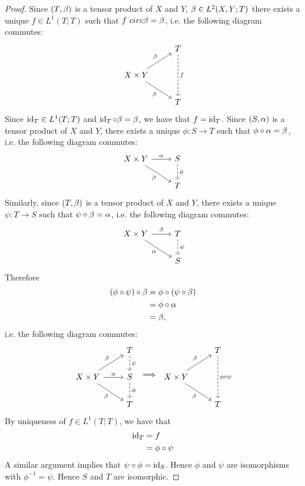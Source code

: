 \documentclass{book}
\begin{document}
 \begin{proof}
 	Since $(T, \beta)$ is a tensor product of $X$ and $Y$, $\beta \in L^2(X,Y; T)$ there exists a unique $f \in L^1(T;T)$ such that $f\ circ \beta = \beta$, i.e. the following diagram commutes: 
 	\[ 
 	\begin{tikzcd}
 		& T \arrow[dd, dashed, "f"] \\
 		X \times Y \arrow[ur, "\be"] \arrow[dr, "\be"'] 
 		&   \\
 		& T 
 	\end{tikzcd}
 	\] 
 	Since $\operatorname{id}_T \in L^1(T;T)$ and $\operatorname{id}_T \circ \beta = \beta$, we have that $f = \operatorname{id}_T$. Since $(S, \alpha)$ is a tensor product of $X$ and $Y$, there exists a unique $\phi: S \rightarrow T$ such that $\phi \circ \alpha = \beta$, i.e. the following diagram commutes: 
 	\[ 
 	\begin{tikzcd}
 		X \times Y \arrow[r, "\al"] \arrow[dr, "\be"'] 	
 		& S  \arrow[d, dashed, "\phi"] \\
 		& T 
 	\end{tikzcd}
 	\] 
 	Similarly, since $(T, \beta)$ is a tensor product of $X$ and $Y$, there exists a unique $\psi: T \rightarrow S$ such that $\psi \circ \beta = \alpha$, i.e. the following diagram commutes: 
 	\[ 
 	\begin{tikzcd}
 		X \times Y \arrow[r, "\be"] \arrow[dr, "\al"'] 	
 		& T  \arrow[d, dashed, "\psi"] \\
 		& S 
 	\end{tikzcd}
 	\] 
 	Therefore 
 	\begin{align*}
 		(\phi \circ \psi) \circ \beta 
 		& = \phi \circ (\psi \circ \beta) \\
 		& = \phi \circ \alpha \\
 		& = \beta, 
 	\end{align*}
 	i.e. the following diagram commutes:
 	\[ 
 	\begin{tikzcd}
 		& T \arrow[d, dashed, "\psi"] \\
 		X \times Y \arrow[ur, "\be"] \arrow[dr, "\be"'] \arrow[r, "\al"]	
 		& S  \arrow[d, dashed, "\phi"] \\
 		& T 
 	\end{tikzcd}
 	\implies
 	\begin{tikzcd}
 		& T \arrow[dd, dashed, "\phi \circ \psi"] \\
 		X \times Y \arrow[ur, "\be"] \arrow[dr, "\be"'] 
 		&  \\
 		& T 
 	\end{tikzcd}
 	\] 
 	By uniqueness of $f \in L^1(T;T)$, we have that 
 	\begin{align*}
 		\operatorname{id}_T
 		& = f \\
 		& = \phi \circ \psi 
 	\end{align*}
 	A similar argument implies that $\psi \circ \phi = \operatorname{id}_S$. Hence $\phi$ and $\psi$ are isomorphisms with $\phi^{-1} = \psi$. Hence $S$ and $T$ are isomorphic.
 \end{proof}
 
\end{document}
